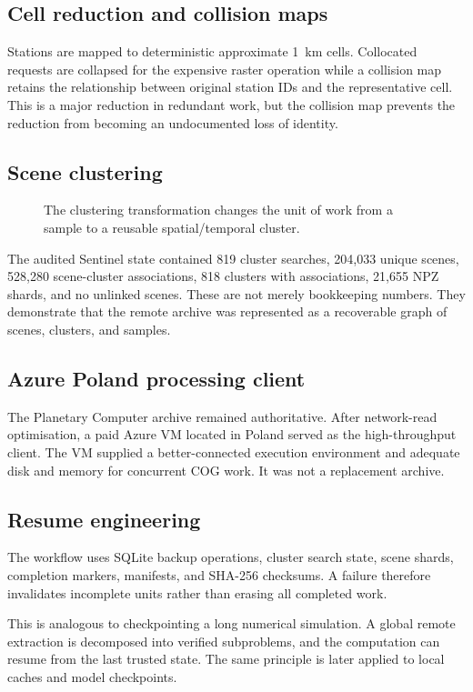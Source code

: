 \documentclass[12pt,a4paper]{report}
\newcommand{\feat}[1]{#1\par}
\begin{document}
\subsection{Cell reduction and collision maps}
Stations are mapped to deterministic approximate 1~km cells. Collocated requests
are collapsed for the expensive raster operation while a collision map retains
the relationship between original station IDs and the representative cell.
This is a major reduction in redundant work, but the collision map prevents the
reduction from becoming an undocumented loss of identity.

\subsection{Scene clustering}
\begin{figure}[H]
\centering

\caption{The clustering transformation changes the unit of work from a sample to a reusable spatial/temporal cluster.}
\end{figure}

The audited Sentinel state contained 819 cluster searches, 204,033 unique
scenes, 528,280 scene-cluster associations, 818 clusters with associations,
21,655 NPZ shards, and no unlinked scenes. These are not merely bookkeeping
numbers. They demonstrate that the remote archive was represented as a
recoverable graph of scenes, clusters, and samples.

\subsection{Azure Poland processing client}
The Planetary Computer archive remained authoritative. After network-read
optimisation, a paid Azure VM located in Poland served as the high-throughput
client. The VM supplied a better-connected execution environment and adequate
disk and memory for concurrent COG work. It was not a replacement archive.

\subsection{Resume engineering}
The workflow uses SQLite backup operations, cluster search state, scene shards,
completion markers, manifests, and SHA-256 checksums. A failure therefore
invalidates incomplete units rather than erasing all completed work.

\feat{This is analogous to checkpointing a long numerical simulation. A global
remote extraction is decomposed into verified subproblems, and the computation
can resume from the last trusted state. The same principle is later applied to
local caches and model checkpoints.}
\end{document}

